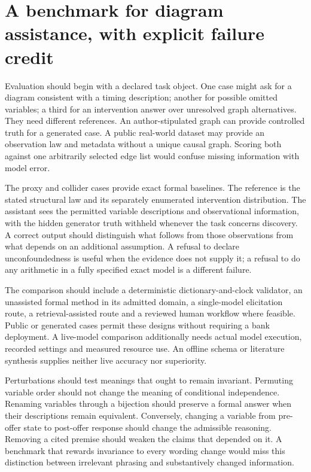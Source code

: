 \hypertarget{a-benchmark-for-diagram-assistance-with-explicit-failure-credit}{%
\section{A benchmark for diagram assistance, with explicit failure
credit}\label{a-benchmark-for-diagram-assistance-with-explicit-failure-credit}}

Evaluation should begin with a declared task object. One case might ask
for a diagram consistent with a timing description; another for possible
omitted variables; a third for an intervention answer over unresolved
graph alternatives. They need different references. An author-stipulated
graph can provide controlled truth for a generated case. A public
real-world dataset may provide an observation law and metadata without a
unique causal graph. Scoring both against one arbitrarily selected edge
list would confuse missing information with model error.

The proxy and collider cases provide exact formal baselines. The
reference is the stated structural law and its separately enumerated
intervention distribution. The assistant sees the permitted variable
descriptions and observational information, with the hidden generator
truth withheld whenever the task concerns discovery. A correct output
should distinguish what follows from those observations from what
depends on an additional assumption. A refusal to declare
unconfoundedness is useful when the evidence does not supply it; a
refusal to do any arithmetic in a fully specified exact model is a
different failure.

The comparison should include a deterministic dictionary-and-clock
validator, an unassisted formal method in its admitted domain, a
single-model elicitation route, a retrieval-assisted route and a
reviewed human workflow where feasible. Public or generated cases permit
these designs without requiring a bank deployment. A live-model
comparison additionally needs actual model execution, recorded settings
and measured resource use. An offline schema or literature synthesis
supplies neither live accuracy nor superiority.

Perturbations should test meanings that ought to remain invariant.
Permuting variable order should not change the meaning of conditional
independence. Renaming variables through a bijection should preserve a
formal answer when their descriptions remain equivalent. Conversely,
changing a variable from pre-offer state to post-offer response should
change the admissible reasoning. Removing a cited premise should weaken
the claims that depended on it. A benchmark that rewards invariance to
every wording change would miss this distinction between irrelevant
phrasing and substantively changed information.

